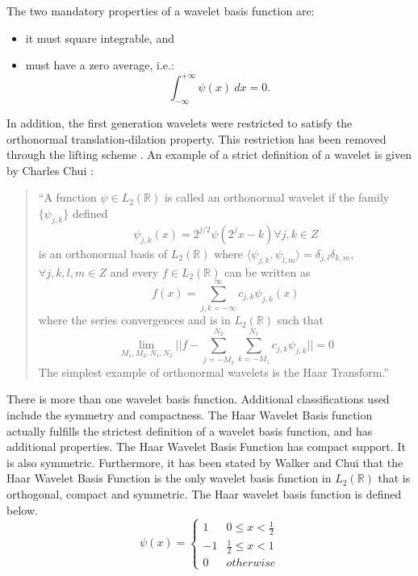 The two mandatory properties of a wavelet basis function are:
\begin{itemize}
\item it must square integrable,   and
\item must have a zero average, i.e.:
\[
\int_{-\infty}^{+\infty}\psi(x) \ dx = 0.
\]
\end{itemize}
In addition, the first generation wavelets were restricted to satisfy
the orthonormal translation-dilation property. This restriction has
been removed through the lifting scheme \cite{Sweldens}. An example
of a strict definition of a wavelet is given by Charles Chui \cite{ChuiIntro}:  
\begin{quote}
``A function $\psi \in L_2({\mathbb R})$ is called an orthonormal wavelet if the family $\{\psi_{j,k}\}$ defined 
\[ \psi_{j,k}(x)  = 2^{j/2} \psi (2 ^j x -k) \forall j,k \in Z \]
is an orthonormal basis of $L_2({\mathbb R})$ where $\langle \psi _{j,k} , \psi_{l,m} \rangle = \delta _{j,l} \delta_{k,m}$,  $ \forall j,k,l,m\in Z$ and every $ f\in L_2({\mathbb R})$ can be written as 
\[ f(x)= \sum\limits _{j,k = -\infty}^{\infty} c_{j,k} \psi _{j,k} (x)  \]
where the series convergences and is %
in $L_2({\mathbb R})$ such that 
\[ \lim\limits _{M_1, M_2, N_1 , N_2} || f - \sum\limits _{j=-M_2}^{N_2} \sum\limits _{k=-M_1}^{N_1} c_{j,k} \psi _{j,k} || = 0 \]
The simplest example of orthonormal wavelets is the Haar Transform.''
\end{quote} 

There is more than one wavelet basis function. Additional classifications used include the symmetry and compactness. The Haar Wavelet Basis function actually fulfills the strictest definition of a wavelet basis function, and has additional properties.  The Haar Wavelet Basis Function has compact support.  It is also symmetric.  Furthermore, it has been stated by Walker\cite{Walker} and  Chui \cite{ChuiIntro} that the Haar Wavelet Basis Function is the only wavelet basis function in $L_2({\mathbb R})$ that is orthogonal, compact and symmetric.  The Haar wavelet basis function is defined below.
\begin{equation} \label{eqn:waveletbasis}
\psi(x) = \left\{
\begin{array}{cc}
1 & 0\le x < \frac{1}{2} \\
-1 & \frac{1}{2} \le x < 1 \\
0 & {otherwise}
\end{array}\right. 
\end{equation}


